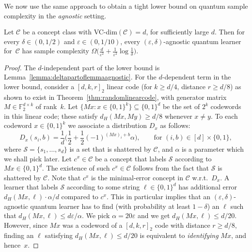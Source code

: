 \documentclass[twoside,11pt]{article}
\newcommand{\eps}{\varepsilon}
\newcommand{\F}{\ensuremath{\mathbb{F}}}
\newcommand{\Sh}{\ensuremath{\mathcal{S}}}
\def\01{\{0,1\}}
\newcommand{\C}{\ensuremath{\mathscr{C}}}
\begin{document}
We now use the same approach to obtain a tight lower bound on quantum sample complexity in the \emph{agnostic} setting.

\begin{theorem}
	Let $\C$ be a concept class with VC-dim$(\C)=d$, for sufficiently large $d$. Then for every $\delta\in (0,1/2)$ and $\eps \in(0,1/10)$, every $(\eps,\delta)$-agnostic quantum learner for~$\C$ has sample complexity 
	$\Omega\Big(\frac{d}{\eps^2} + \frac{1}{\eps^2}\log \frac{1}{\delta}\Big)$.
\end{theorem}

\begin{proof}
	The $d$-independent part of the lower bound is Lemma~\ref{lemma:deltapartoflemmaagnostic}. For the $d$-dependent term in the lower bound, consider a $[d,k,r]_2$ linear code (for $k\geq d/4$, distance $r\geq d/8$) as shown to exist in Theorem~\ref{thm:randomlinearcode}, with generator matrix $M\in \F_2^{d\times k}$ of rank~$k$. Let $\{Mx:x\in \01^k\} \subseteq \01^{d}$ be the set of $2^k$ codewords in this linear code; these satisfy $d_H(Mx,My)\geq d/8$ whenever $x\neq y$. To each codeword $x\in\01^k$ we associate a distribution $D_x$ as follows:
	$$
	D_x(s_i,b)=\frac{1}{d} \Big (\frac{1}{2}+\frac{1}{2}(-1)^{(Mx)_i+b}\alpha \Big), \qquad  \text{for }  (i,b)\in [d]\times \01,
	$$ 
	where $\Sh=\{s_1,\ldots,s_d\}$ is a set that is shattered by $\C$, and $\alpha$ is a parameter which we shall pick later. Let $c^{x}\in\C$ be a concept that labels $\Sh$ according to $Mx\in \01^d$. The existence of such $c^x\in\C$ follows from the fact that $\Sh$ is shattered by $\C$. Note that $c^{x}$ is the minimal-error concept in $\C$ w.r.t.\ $D_x$. A learner that labels $\Sh$ according to some string $\ell\in\01^d$ has additional error $d_H(Mx,\ell)\cdot \alpha/d$ compared to $c^x$. This in particular implies that an $(\eps,\delta)$-agnostic quantum learner has to find (with probability at least $1-\delta$) an $\ell$ such that $d_H(Mx,\ell)\leq d\eps/\alpha$. We pick $\alpha=20\eps$ and we get $d_H(Mx,\ell)\leq d/20$. However, since $Mx$ was a codeword of a $[d,k,r]_2$ code with distance $r\geq d/8$, finding an $\ell$ satisfying $d_H(Mx,\ell)\leq d/20$ is equivalent to \emph{identifying} $Mx$, and hence~$x$.
	

\end{proof}
\end{document}
